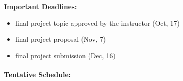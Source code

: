 \documentclass[12pt]{article}
\begin{document}
\vspace*{.15in}

\noindent\textbf{Important Deadlines:} 

\begin{itemize}
  \item final project topic approved by the instructor (Oct, 17)
  \item final project proposal (Nov, 7)
  \item final project submission (Dec, 16) 
\end{itemize}



\clearpage
\paragraph*{Tentative Schedule:}
\end{document}
